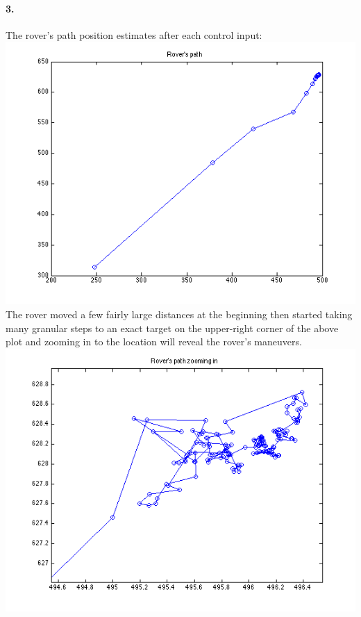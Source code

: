 \documentclass[a4paper]{article}
\begin{document}
\paragraph{3. } The rover's path position estimates after each control input: \\
\includegraphics[scale=.75]{rover_path.png} \\
The rover moved a few fairly large distances at the beginning then started taking many granular steps to an exact target on the upper-right corner of the above plot and zooming in to the location will reveal the rover's maneuvers. \\
\includegraphics[scale=.75]{rover_path_zoom_in.png} \\
\end{document}
